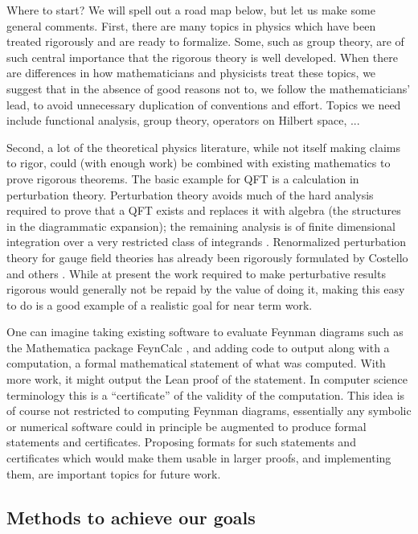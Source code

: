 \documentclass{article}
\newcommand{\1}{\mathbbm{1}}
\theoremstyle{plain}
\theoremstyle{definition}
\numberwithin{equation}{section}
\begin{document}
Where to start?  We will spell out a road map below, but let us make some general comments.
First, there are many topics in physics which have been treated rigorously and are ready to formalize.  Some, such as group theory, are of such central importance that the rigorous theory is well developed.   When there are differences in how mathematicians and physicists treat these topics, we suggest that in the absence of good reasons not to, we follow the mathematicians' lead, to avoid unnecessary duplication of conventions and effort.  
Topics we need include functional analysis, group theory, operators on Hilbert space, ...

Second, a lot of the theoretical physics literature, while not itself making claims to rigor, could (with enough work) be combined with existing mathematics to prove rigorous theorems.  The basic example for QFT is a calculation in perturbation theory.  Perturbation theory avoids much of the hard analysis required to prove that a QFT exists and replaces it with algebra (the structures in the diagrammatic expansion); the remaining analysis is of finite dimensional integration over a very restricted class of integrands \cite{}.  Renormalized perturbation theory for gauge field theories has already been rigorously formulated by Costello and others \cite{}.  While at present the work required to  make perturbative results rigorous would generally not be repaid by the value of doing it, making this easy to do is a good example of a realistic goal for near term work.

One can imagine taking existing software to evaluate Feynman diagrams such as the Mathematica package FeynCalc \cite{},
and adding code to output along with a computation, a formal mathematical statement
of what was computed.  With more work, it might output the Lean proof of the statement.  In computer science terminology this is a ``certificate'' of the validity of the computation.  This idea is of course not restricted to computing Feynman diagrams, essentially any symbolic or numerical software could in principle be augmented to produce formal statements and certificates.  Proposing formats for such statements and certificates which would make them usable in larger proofs, and implementing them, are important topics for future work.

\subsection{Methods to achieve our goals}
\end{document}
